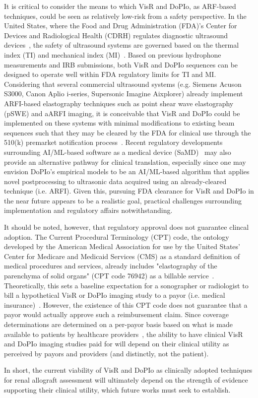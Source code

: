 It is critical to consider the means to which VisR and DoPIo, as ARF-based techniques, could be seen as relatively low-risk from a safety perspective. In the United States, where the Food and Drug Administration (FDA)'s Center for Devices and Radiological Health (CDRH) regulates diagnostic ultrasound devices~\cite{wreh_Premarket_2023}, the safety of ultrasound systems are governed based on the thermal index (TI) and mechanical index (MI)~\cite{fda_Marketing_2019}. Based on previous hydrophone measurements and IRB submissions, both VisR and DoPIo sequences can be designed to operate well within FDA regulatory limits for TI and MI. Considering that several commercial ultrasound systems (e.g. Siemens Acuson S3000, Canon Aplio i-series, Supersonic Imagine Aixplorer) already implement ARFI-based elastography techniques such as point shear wave elastography (pSWE) and aARFI imaging, it is conceivable that VisR and DoPIo could be implemented on these systems with minimal modifications to existing beam sequences such that they may be cleared by the FDA for clinical use through the 510(k) premarket notification process~\cite{wreh_Premarket_2023}. Recent regulatory developments surrounding AI/ML-based software as a medical device (SaMD)~\cite{fda_Software_2017,fda_Artificial_2025} may also provide an alternative pathway for clinical translation, especially since one may envision DoPIo's empirical models to be an AI/ML-based algorithm that applies novel postprocessing to ultrasonic data acquired using an already-cleared technique (i.e. ARFI). Given this, pursuing FDA clearance for VisR and DoPIo in the near future appears to be a realistic goal, practical challenges surrounding implementation and regulatory affairs notwithstanding.

It should be noted, however, that regulatory approval does not guarantee clincal adoption. The Current Procedural Terminology (CPT) code, the ontology developed by the American Medical Association for use by the United States' Center for Medicare and Medicaid Services (CMS) as a standard definition of medical procedures and services, already includes "elastography of the parenchyma of solid organs" (CPT code 76942) as a billable service~\cite{ama_Current_2024,volpert_Nurses_2022}. Theoretically, this sets a baseline expectation for a sonographer or radiologist to bill a hypothetical VisR or DoPIo imaging study to a payor (i.e. medical insurance)~\cite{ali_Clinical_2025}. However, the existence of this CPT code does not guarantee that a payor would actually approve such a reimbursement claim. Since coverage determinations are determined on a per-payor basis based on what is made available to patients by healthcare providers~\cite{roginiel_Evidence_2018}, the ability to have clinical VisR and DoPIo imaging studies paid for will depend on their clinical utility as perceived by payors and providers (and distinctly, not the patient).

In short, the current viability of VisR and DoPIo as clinically adopted techniques for renal allograft assessment will ultimately depend on the strength of evidence supporting their clinical utility, which future works must seek to establish.
